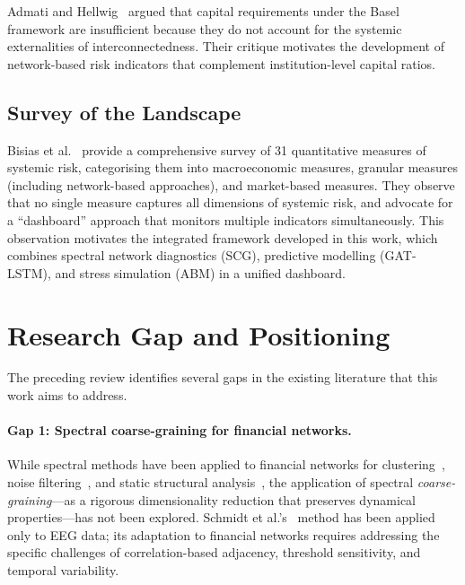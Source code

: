Admati and Hellwig~\cite{admati2013fallacies} argued that capital
requirements under the Basel framework are insufficient because they
do not account for the systemic externalities of interconnectedness.
Their critique motivates the development of network-based risk
indicators that complement institution-level capital ratios.

\subsection{Survey of the Landscape}
\label{sec:survey}

Bisias et al.~\cite{bisias2012survey} provide a comprehensive survey of
31 quantitative measures of systemic risk, categorising them into
macroeconomic measures, granular measures (including network-based
approaches), and market-based measures.  They observe that no single
measure captures all dimensions of systemic risk, and advocate for a
``dashboard'' approach that monitors multiple indicators simultaneously.
This observation motivates the integrated framework developed in this
work, which combines spectral network diagnostics (SCG), predictive
modelling (GAT-LSTM), and stress simulation (ABM) in a unified
dashboard.


\section{Research Gap and Positioning}
\label{sec:research_gap}

The preceding review identifies several gaps in the existing literature
that this work aims to address.

\paragraph{Gap 1: Spectral coarse-graining for financial networks.}
While spectral methods have been applied to financial networks for
clustering~\cite{luxburg2007tutorial,kyriakopoulos2009network}, noise
filtering~\cite{laloux1999noise}, and static structural
analysis~\cite{bonanno2004networks}, the application of spectral
\emph{coarse-graining}---as a rigorous dimensionality reduction that
preserves dynamical properties---has not been explored.  Schmidt et
al.'s~\cite{schmidt2024spectral} method has been applied only to EEG
data; its adaptation to financial networks requires addressing the
specific challenges of correlation-based adjacency, threshold
sensitivity, and temporal variability.

